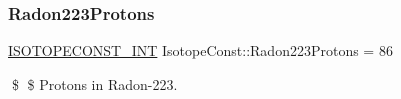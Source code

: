 \subsubsection{\texorpdfstring{Radon223\+Protons}{Radon223Protons}}
{\footnotesize\ttfamily \mbox{\hyperlink{group___isotope_const-_macros_ga5f18360b3e99483a35c32d789e62621c}{I\+S\+O\+T\+O\+P\+E\+C\+O\+N\+S\+T\+\_\+\+I\+NT}} Isotope\+Const\+::\+Radon223\+Protons = 86}

\$ \$ Protons in Radon-\/223. 